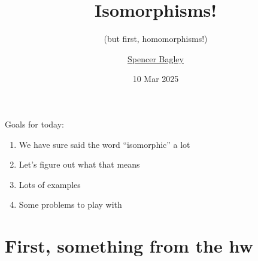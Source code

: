 \documentclass[8pt, handout]{beamer}
\title[Homomorphisms!]{Isomorphisms!}
\subtitle{(but first, homomorphisms!)}
\author[\href{mailto:sbagley@westminsteru.edu}{S. Bagley}]
       {\href{mailto:sbagley@westminsteru.edu}{Spencer Bagley}}
\institute[Westminster] { 
  \normalsize With many thanks to Matthew Macauley, \\
  \url{http://www.math.clemson.edu/~macaule/}}
\date[10 Mar 2025]{10 Mar 2025}
\begin{document}
\frame{\titlepage}


\begin{frame}{Goals for today:}
  \begin{enumerate}
    \item We have sure said the word ``isomorphic'' a lot
    \item Let's figure out what that  means
    \item Lots of examples
    \item Some problems to play with
  \end{enumerate}
\end{frame}

\section{First, something from the hw}
\end{document}
